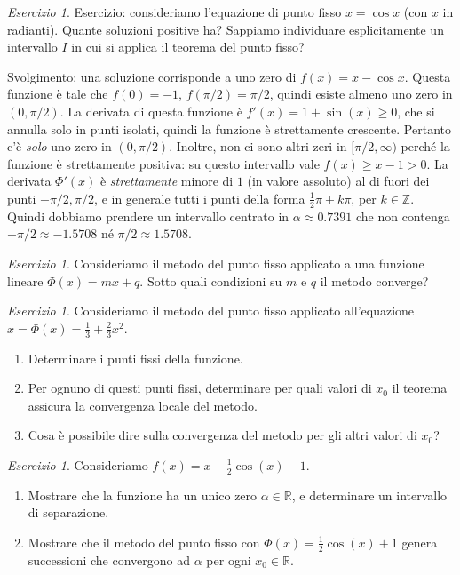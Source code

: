 \documentclass[a4paper]{report}
\theoremstyle{definition}
\theoremstyle{remark}
\newtheorem{esercizio}[theorem]{Esercizio}
\begin{document}
\begin{esercizio}
Esercizio: consideriamo l'equazione di punto fisso $x = \cos x$ (con $x$ in radianti). Quante soluzioni positive ha? Sappiamo individuare esplicitamente un intervallo $I$ in cui si applica il teorema del punto fisso?
\end{esercizio}

Svolgimento: una soluzione corrisponde a uno zero di $f(x) = x - \cos x$. Questa funzione è tale che $f(0) = -1$, $f(\pi/2) = \pi/2$, quindi esiste almeno uno zero in $(0,\pi/2)$. La derivata di questa funzione è $f'(x) = 1 + \sin(x) \geq 0$, che si annulla solo in punti isolati, quindi la funzione è strettamente crescente. Pertanto c'è \emph{solo} uno zero in $(0,\pi/2)$. Inoltre, non ci sono altri zeri in $[\pi/2, \infty)$ perché la funzione è strettamente positiva: su questo intervallo vale $f(x) \geq x - 1 > 0$. La derivata $\Phi'(x)$ è \emph{strettamente} minore di $1$ (in valore assoluto) al di fuori dei punti $-\pi/2, \pi/2$, e in generale tutti i punti della forma $\frac12 \pi + k\pi$, per $k\in\mathbb{Z}$. Quindi dobbiamo prendere un intervallo centrato in $\alpha \approx 0.7391$ che non contenga $-\pi/2 \approx -1.5708$ né $\pi/2 \approx 1.5708$.

\begin{esercizio}
    Consideriamo il metodo del punto fisso applicato a una funzione lineare $\Phi(x) = mx + q$. Sotto quali condizioni su $m$ e $q$ il metodo converge?
\end{esercizio}
\begin{esercizio}
    Consideriamo il metodo del punto fisso applicato all'equazione $x = \Phi(x) = \frac13 + \frac23 x^2$. 
    \begin{enumerate}
        \item Determinare i punti fissi della funzione.
        \item Per ognuno di questi punti fissi, determinare per quali valori di $x_0$ il teorema assicura la convergenza locale del metodo.
        \item Cosa è possibile dire sulla convergenza del metodo per gli altri valori di $x_0$?
    \end{enumerate}
\end{esercizio}
\begin{esercizio}
    Consideriamo $f(x) =x - \frac{1}{2}\cos(x) - 1$.
    \begin{enumerate}
        \item Mostrare che la funzione ha un unico zero $\alpha \in \mathbb{R}$, e determinare un intervallo di separazione.
        \item Mostrare che il metodo del punto fisso con $\Phi(x) = \frac{1}{2}\cos(x) + 1$ genera successioni che convergono ad $\alpha$ per ogni $x_0\in\mathbb{R}$.
    \end{enumerate}
\end{esercizio}
\end{document}
